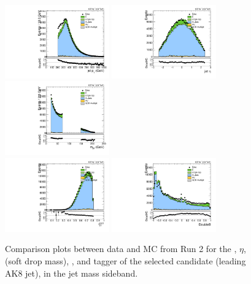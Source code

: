 \begin{figure}[htbp]
  \centering
  \includegraphics[width=0.4\textwidth]{fig/controlPlots/SB_b1_allL_allP_allC_allD_Run2_lnujj_l2_pt.pdf}
  \includegraphics[width=0.4\textwidth]{fig/controlPlots/SB_b1_allL_allP_allC_allD_Run2_lnujj_l2_eta.pdf}\\
  \includegraphics[width=0.4\textwidth]{fig/controlPlots/SB_b1_allL_allP_allC_allD_Run2_mjet.pdf}\\
  \includegraphics[width=0.4\textwidth]{fig/controlPlots/SB_b1_allL_allP_allC_allD_Run2_tau21DDT.pdf}
  \includegraphics[width=0.4\textwidth]{fig/controlPlots/SB_b1_allL_allP_allC_allD_Run2_DoubleB.pdf}\\
  \caption{
    Comparison plots between data and MC from Run 2 for the \pt, $\eta$, \MJ (soft drop mass), \nsubjDDT, and \DoubleB tagger of the selected \Vhad candidate (leading AK8 jet), in the jet mass sideband.
  }
  \label{fig:SB_controlPlotsRun2_3}
\end{figure}

